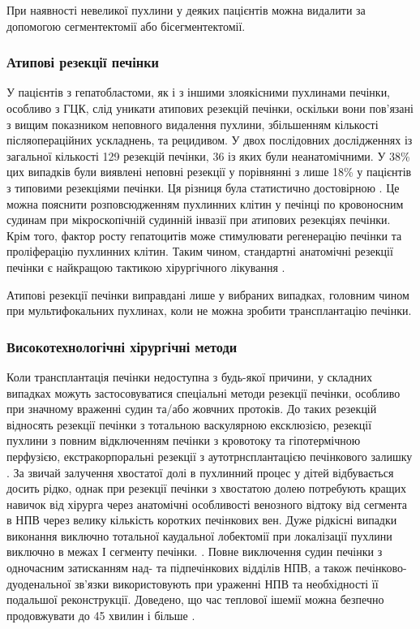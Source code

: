 При наявності невеликої пухлини у деяких пацієнтів можна видалити за допомогою сегментектомії або бісегментектомії.
\subsubsection{Атипові резекції печінки}
У пацієнтів з гепатобластоми, як і з іншими злоякісними пухлинами печінки, особливо з ГЦК, слід уникати атипових резекцій печінки, оскільки вони пов'язані з вищим показником неповного видалення пухлини, збільшенням кількості післяопераційних ускладнень, та рецидивом. У двох послідовних дослідженнях із загальної кількості 129 резекцій печінки, 36 із яких були неанатомічними. У 38\% цих випадків були виявлені неповні резекції у порівнянні з лише 18\% у пацієнтів з типовими резекціями печінки. Ця різниця була статистично достовірною \cite{pmid33526266}. Це можна пояснити розповсюдженням пухлинних клітин у печінці по кровоносним судинам при мікроскопічній судинній інвазії при атипових резекціях печінки. Крім того, фактор росту гепатоцитів може стимулювати регенерацію печінки та проліферацію пухлинних клітин. Таким чином, стандартні анатомічні резекції печінки є найкращою тактикою хірургічного лікування \cite{pmid33575308}. 

Атипові резекції печінки виправдані лише у вибраних випадках, головним чином при мультифокальних пухлинах, коли не можна зробити трансплантацію печінки. 

\subsubsection{Високотехнологічні хірургічні методи}

Коли трансплантація печінки недоступна з будь-якої причини, у складних випадках можуть застосовуватися спеціальні методи резекції печінки, особливо при значному враженні судин та/або жовчних протоків. До таких резекцій відносять резекції печінки з тотальною васкулярною ексклюзією, резекції пухлини з повним відключенням печінки з кровотоку та гіпотермічною перфузією, екстракорпоральні резекції з аутотрнсплантацією печінкового залишку \cite{pmid33718305}. За звичай залучення хвостатої долі в пухлинний процес у дітей відбувається досить рідко, однак при резекції печінки з хвостатою долею потребують кращих навичок від хірурга через анатомічні особливості венозного відтоку від сегмента в НПВ через велику кількість коротких печінкових вен. Дуже рідкісні випадки виконання виключно тотальної каудальної лобектомії при локалізації пухлини виключно в межах І сегменту печінки. \cite{pmid34441025}. Повне виключення судин печінки з одночасним затисканням над- та підпечінкових відділів НПВ, а також печінково-дуоденальної зв’язки використовують при ураженні НПВ та необхідності її  подальшої реконструкції. Доведено, що час теплової ішемії можна безпечно продовжувати до 45 хвилин і більше \cite{pmid7754739}. 


